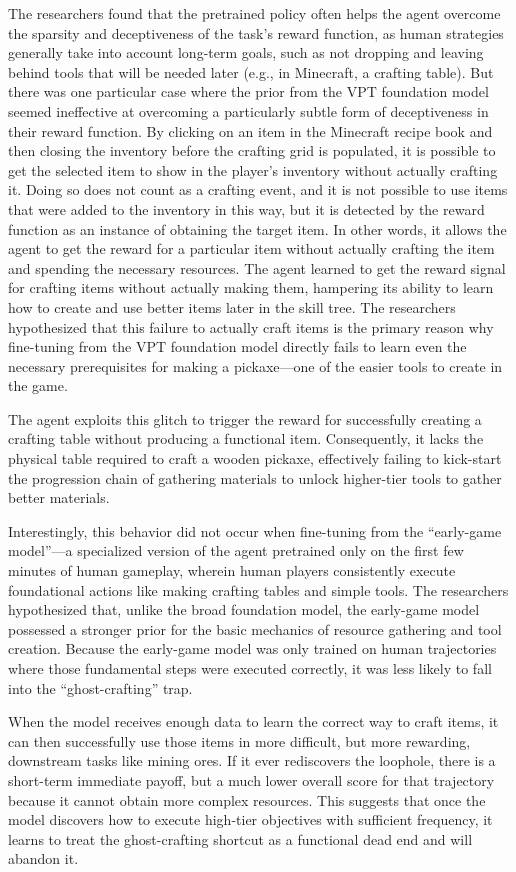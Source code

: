 The researchers found that the pretrained policy often helps the agent overcome the sparsity and deceptiveness of the task's reward function, as human strategies generally take into account long-term goals, such as not dropping and leaving behind tools that will be needed later (e.g., in Minecraft, a crafting table).
But there was one particular case where the prior from the VPT foundation model seemed ineffective at overcoming a particularly subtle form of deceptiveness in their reward function.
By clicking on an item in the Minecraft recipe book and then closing the inventory before the crafting grid is populated, it is possible to get the selected item to show in the player's inventory without actually crafting it. 
Doing so does not count as a crafting event, and it is not possible to use items that were added to the inventory in this way, but it is detected by the reward function as an instance of obtaining the target item.
In other words, it allows the agent to get the reward for a particular item without actually crafting the item and spending the necessary resources.
The agent learned to get the reward signal for crafting items without actually making them, hampering its ability to learn how to create and use better items later in the skill tree. 
The researchers hypothesized that this failure to actually craft items is the primary reason why fine-tuning from the VPT foundation model directly fails to learn even the necessary prerequisites for making a pickaxe---one of the easier tools to create in the game.

The agent exploits this glitch to trigger the reward for successfully creating a crafting table without producing a functional item. 
Consequently, it lacks the physical table required to craft a wooden pickaxe, effectively failing to kick-start the progression chain of gathering materials to unlock higher-tier tools to gather better materials.

Interestingly, this behavior did not occur when fine-tuning from the ``early-game model''---a specialized version of the agent pretrained only on the first few minutes of human gameplay, wherein human players consistently execute foundational actions like making crafting tables and simple tools.
The researchers hypothesized that, unlike the broad foundation model, the early-game model possessed a stronger prior for the basic mechanics of resource gathering and tool creation.
Because the early-game model was only trained on human trajectories where those fundamental steps were executed correctly, it was less likely to fall into the ``ghost-crafting'' trap.

When the model receives enough data to learn the correct way to craft items, it can then successfully use those items in more difficult, but more rewarding, downstream tasks like mining ores. 
If it ever rediscovers the loophole, there is a short-term immediate payoff, but a much lower overall score for that trajectory because it cannot obtain more complex resources.
This suggests that once the model discovers how to execute high-tier objectives with sufficient frequency, it learns to treat the ghost-crafting shortcut as a functional dead end and will abandon it.  
